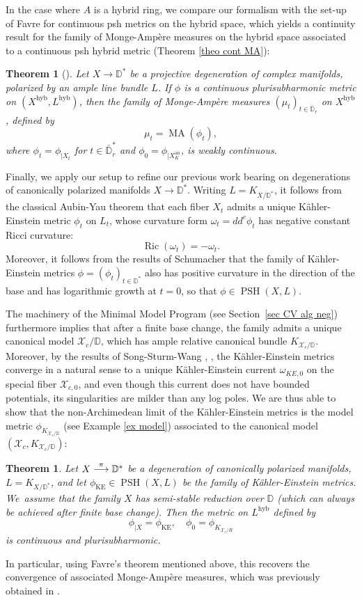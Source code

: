\documentclass[JEP,XML,SOM,Unicode,published]{cedram}
\newcommand{\To}[1]{\mathchoice{\xrightarrow{\textstyle\kern4pt#1\kern3pt}}{\stackrel{#1}{\longrightarrow}}{}{}}
\newtheorem{theo}[equation]{Theorem}
\newtheorem{thmA}{Theorem}
\theoremstyle{definition}
\newcommand \D {\mathbb{D}}
\newcommand \X {\mathscr{X}}
\newcommand{\an}{\mathrm{an}}
\newcommand{\hyb}{\mathrm{hyb}}
\DeclareMathOperator{\KE}{KE}
\DeclareMathOperator{\MA}{MA}
\DeclareMathOperator{\PSH}{PSH}
\DeclareMathOperator{\Ric}{Ric}
\begin{document}
In the case where $A$ is a hybrid ring, we compare our formalism with the set-up of Favre \cite{Fav} for continuous psh metrics on the hybrid space, which yields a continuity result for the family of Monge-Ampère measures on the hybrid space associated to a continuous psh hybrid metric (Theorem \ref{theo cont MA}):
\begin{theo}[{\cite[Th.\,4.2]{Fav}}] \label{theo Favre intro} Let $X \to \D^*$ be a projective degeneration of complex manifolds, polarized by an ample line bundle $L$. If $\phi$ is a continuous plurisubharmonic metric on $(X^{\hyb}, L^{\hyb})$, then the family of Monge-Ampère measures $(\mu_t)_{t \in \bar{\D}_r}$ on $X^{\hyb}$, defined by\vspace*{-3pt}
\[
\mu_t = \MA(\phi_t),
\]
where $\phi_t = \phi_{| X_t}$ for $t \in \bar{\D}^*_r$ and $\phi_0 = \phi_{| X^{\an}_K}$, is weakly continuous.
\end{theo}
Finally, we apply our setup to refine our previous work \cite{PS} bearing on degenerations of canonically polarized manifolds $X \to \D^*$. Writing $L = K_{X/\D^*}$, it follows from the classical Aubin-Yau theorem that each fiber $X_t$ admits a unique Kähler-Einstein metric $\phi_t$ on $L_t$, whose curvature form $\omega_t = dd^c \phi_t$ has negative constant Ricci curvature:\vspace*{-3pt}
\[
\Ric(\omega_t) = -\omega_t.
\]
Moreover, it follows from the results of Schumacher \cite{Schu} that the family of Kähler-Einstein metrics $\phi =(\phi_t)_{t \in \D^*}$ also has positive curvature in the direction of the base and has logarithmic growth at $t=0$, so that $\phi \in \PSH(X, L)$.

The machinery of the Minimal Model Program (see Section~\ref{sec CV alg neg}) furthermore implies that after a finite base change, the family admits a unique canonical model $\X_c / \D$, which has ample relative canonical bundle $K_{\X_c/\D}$. Moreover, by the results of Song-Sturm-Wang \cite{Song}, \cite{SSW}, the Kähler-Einstein metrics converge in a natural sense to a unique Kähler-Einstein current $\omega_{KE, 0}$ on the special fiber $\X_{c, 0}$, and even though this current does not have bounded potentials, its singularities are milder than any log poles. We are thus able to show that the non-Archimedean limit of the Kähler-Einstein metrics is the model metric $\phi_{K_{\X_c/\D}}$ (see Example \ref{ex model}) associated to the canonical model $(\X_c, K_{\X_c/\D})$:
\begin{thmA}\label{th:B}
Let $X \To{\pi} \D^*$ be a degeneration of canonically polarized manifolds, $L = K_{X/\D^*}$, and let $\phi_{\KE} \in \PSH(X, L)$ be the family of Kähler-Einstein metrics. We~assume that the family $X$ has semi-stable reduction over $\D$ (which can always be achieved after finite base change). Then the metric on $L^{\hyb}$ defined by
\[
\phi_{| X} = \phi_{\KE},\quad\phi_0 = \phi_{K_{\X_c/R}}
\]
is continuous and plurisubharmonic.
\end{thmA}
In particular, using Favre's theorem mentioned above, this recovers the convergence of associated Monge-Ampère measures, which was previously obtained in \cite[Th.\,A]{PS}.
\end{document}
